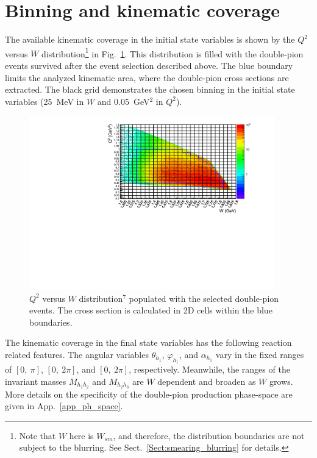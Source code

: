 \section{Binning and kinematic coverage}
\label{Sect:binning}

The available kinematic coverage in the initial state variables is shown by the $Q^2$ versus $W$ distribution\footnote[7]{Note that $W$ here is $W_{sm}$, and therefore, the distribution boundaries are not subject to the blurring. See Sect.~\ref{Sect:smearing_blurring} for details.} in Fig.~\ref{fig:q2_vs_w}. This distribution is filled with the double-pion events survived after the event selection described above. The blue boundary limits the analyzed kinematic area, where the double-pion cross sections are extracted. The black grid demonstrates the chosen binning in the initial state variables (25~MeV in $W$ and 0.05~GeV$^{2}$ in $Q^{2}$).



\begin{figure}[htp]
\begin{center}
\includegraphics[width=0.95\textwidth]{pictures/cross_section/q2vsw_new.pdf}
\caption{\small $Q^2$ versus $W$ distribution$^{7}$ populated with the selected double-pion events. The cross section is calculated in 2D cells within the blue boundaries.} \label{fig:q2_vs_w}
\end{center}
\end{figure}

The kinematic coverage in the final state variables has the following reaction related features. The angular variables $\theta_{h_{1}}$, $\varphi_{h_{1}}$, and $\alpha_{h_{1}}$ vary in the fixed ranges of $[0,~\pi]$, $[0,~2\pi]$, and $[0,~2\pi]$, respectively. Meanwhile, the ranges of the invariant masses $M_{h_{1}h_{2}}$ and $M_{h_{2}h_{3}}$ are $W$ dependent and broaden as $W$ grows. More details on the specificity of the double-pion production phase-space are given in App.~\ref{app_ph_space}. 

